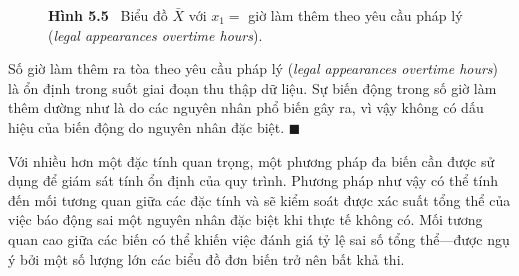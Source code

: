 \begin{figure}[htbp]
\centering
{}

\vspace{-0.5em}
{\textbf{Hình 5.5} \ Biểu đồ $\bar{X}$ với $x_1 =$ giờ làm thêm theo yêu cầu pháp lý (\textit{legal appearances overtime hours}).}
\end{figure}

Số giờ làm thêm ra tòa theo yêu cầu pháp lý (\textit{legal appearances overtime hours}) là ổn định trong suốt giai đoạn thu thập dữ liệu. Sự biến động trong số giờ làm thêm dường như là do các nguyên nhân phổ biến gây ra, vì vậy không có dấu hiệu của biến động do nguyên nhân đặc biệt. \hfill $\blacksquare$

Với nhiều hơn một đặc tính quan trọng, một phương pháp đa biến cần được sử dụng để giám sát tính ổn định của quy trình. Phương pháp như vậy có thể tính đến mối tương quan giữa các đặc tính và sẽ kiểm soát được xác suất tổng thể của việc báo động sai một nguyên nhân đặc biệt khi thực tế không có. Mối tương quan cao giữa các biến có thể khiến việc đánh giá tỷ lệ sai số tổng thể—được ngụ ý bởi một số lượng lớn các biểu đồ đơn biến trở nên bất khả thi.

